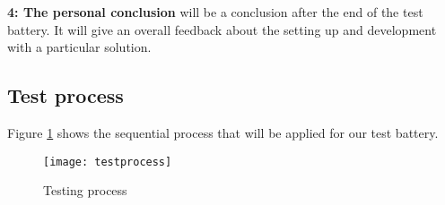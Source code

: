 \textbf{4: The personal conclusion} will be a conclusion after the end of the test battery. It will give an overall feedback about the setting up and development with a particular solution.

\subsection{Test process}

Figure \ref{fig tprocess} shows the sequential process that will be applied for our test battery.

\begin{figure}[h!]
\centering
\texttt{[image: testprocess]}
\caption{Testing process}
\label{fig tprocess}
\end{figure}